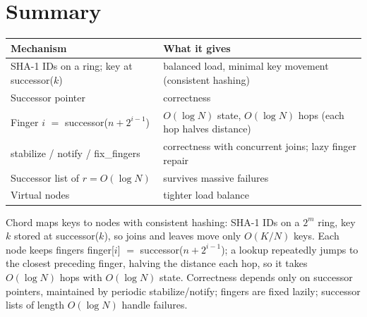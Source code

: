 \section{Summary}
\begin{center}
\small
\begin{tabularx}{\linewidth}{@{}lX@{}}
\toprule
Mechanism & What it gives\\
\midrule
SHA-1 IDs on a ring; key at successor($k$) & balanced load, minimal key movement (consistent hashing)\\
Successor pointer & correctness\\
Finger $i$ $=$ successor($n + 2^{i-1}$) & $O(\log N)$ state, $O(\log N)$ hops (each hop halves distance)\\
stabilize / notify / fix\_fingers & correctness with concurrent joins; lazy finger repair\\
Successor list of $r = O(\log N)$ & survives massive failures\\
Virtual nodes & tighter load balance\\
\bottomrule
\end{tabularx}
\end{center}

\begin{keybox}
Chord maps keys to nodes with consistent hashing: SHA-1 IDs on a $2^m$ ring, key $k$ stored at successor($k$), so joins and leaves move only $O(K/N)$ keys. Each node
keeps fingers finger[$i$] $=$ successor($n + 2^{i-1}$); a lookup repeatedly jumps to the closest preceding finger, halving the distance each hop, so it takes
$O(\log N)$ hops with $O(\log N)$ state. Correctness depends only on successor pointers, maintained by periodic stabilize/notify; fingers are fixed lazily;
successor lists of length $O(\log N)$ handle failures.
\end{keybox}

